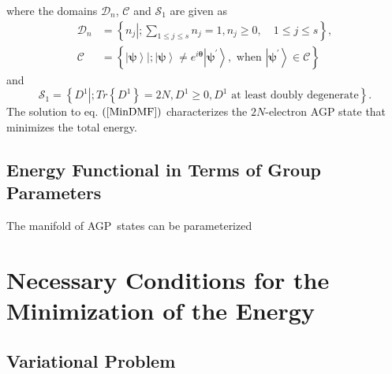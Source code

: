 \documentclass[aps,preprint]{revtex4}%
\begin{document}
where the domains $\mathcal{D}_{n}$, $\mathcal{C}$ and $\mathcal{S}_{1}$ are
given as%
\begin{align}
\mathcal{D}_{n} &  =\left\{  \left.  n_{j}\right\vert ;\sum_{1\leq j\leq
s}n_{j}=1,n_{j}\geq0,\quad1\leq j\leq s\right\}  ,\\
\mathcal{C} &  =\left\{  \left.  \left\vert \mathbf{\psi}\right\rangle
\right\vert ;\left\vert \mathbf{\psi}\right\rangle \neq e^{i\mathbf{\theta}%
}\left\vert \mathbf{\psi}^{\prime}\right\rangle ,\text{ when }\left\vert
\mathbf{\psi}^{\prime}\right\rangle \in\mathcal{C}\right\}
\end{align}
and
\begin{equation}
\mathcal{S}_{1}=\left\{  \left.  D^{1}\right\vert ;Tr\left\{  D^{1}\right\}
=2N,D^{1}\geq0,D^{1}\text{ at least doubly degenerate}\right\}  .
\end{equation}
The solution to eq. $\left(  \ref{MinDMF}\right)  $ characterizes the
$2N$-electron AGP state that minimizes the total energy.

\subsection{Energy Functional in Terms of Group Parameters}

The manifold of AGP\ states can be parameterized 

\section{Necessary Conditions for the Minimization of the Energy
\label{Evariation}}

\subsection{Variational Problem}
\end{document}

